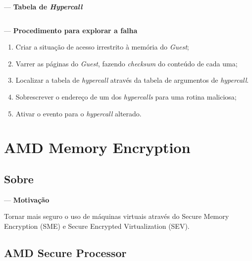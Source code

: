 \documentclass{beamer}
\newcommand{\innertitle}[1]{\textbf{\large {#1}}}
\newcommand{\autotitle}[1]{\secname{} --- \subsecname}
\begin{document}
\begin{frame}[fragile]{\secname{} --- \subsecname}
    \innertitle{Tabela de \textit{Hypercall}}

    \inputminted[fontsize=\scriptsize]{asm}{hypercall-table.S}
\end{frame}

\begin{frame}{\autotitle{}}
    \innertitle{Procedimento para explorar a falha}

    \begin{enumerate}
        \item Criar a situação de acesso irrestrito à memória do
            \textit{Guest};
        \item Varrer as páginas do \textit{Guest}, fazendo \textit{checksum} do
            conteúdo de cada uma;
        \item Localizar a tabela de \textit{hypercall} através da tabela de
            argumentos de \textit{hypercall}.
        \item Sobrescrever o endereço de um dos \textit{hypercalls} para uma
            rotina maliciosa;
        \item Ativar o evento para o \textit{hypercall} alterado.
    \end{enumerate}
\end{frame}

\section{AMD Memory Encryption}

\subsection{Sobre}

\begin{frame}{\autotitle{}}
    \innertitle{Motivação}

    Tornar mais seguro o uso de máquinas virtuais através do Secure Memory
    Encryption (SME) e Secure Encrypted Virtualization (SEV).
\end{frame}

\subsection{AMD Secure Processor}
\end{document}
